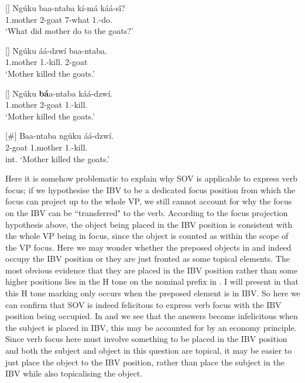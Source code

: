 \documentclass[output=paper,colorlinks,citecolor=brown,
]{langscibook}
\begin{document}
\begin{exe}
    \ex \label{50}
    \begin{xlist}
\ex
[]{
\label{50a}
\gll
Ng\'{u}ku baa-ntaba kí-má káá-sî?\\
1.mother 2-goat 7-what 1\Sm{}.\Pst{}-do.\Pst{}\\
\trans ‘What did mother do to the goats?’
}

\ex
[]{
\label{50b}
\gll
Ng\'{u}ku áá-dzwí baa-ntaba.\\
1.mother 1\Sm{}.\Pst{}-kill.\Pst{} 2-goat\\
\trans ‘Mother killed the goats.’
}

\ex
[]{
\label{50c}
\gll
Ng\'{u}ku \textbf{b\'{a}}a-ntaba káá-dzwí.\\
1.mother 2-goat 1\Sm{}.\Pst{}-kill.\Pst{}\\
\trans ‘Mother killed the goats.’
}

\ex
[\#]{
\label{50d}
\gll
Baa-ntaba ng\'{u}ku áá-dzwí.\\
2-goat 1.mother 1\Sm{}.\Pst{}-kill.\Pst{}\\
\trans int. ‘Mother killed the goats.’
}

    \end{xlist}
\end{exe}
Here it is somehow problematic to explain why SOV is applicable to express verb focus; if we hypothesise the IBV to be a dedicated focus position from which the focus can project up to the whole VP, we still cannot account for why the focus on the IBV can be ``transferred" to the verb. According to the focus projection hypothesis above, the object being placed in the IBV position is consistent with the whole VP being in focus, since the object is counted as within the scope of the VP focus. Here we may wonder whether the preposed objects in  and  indeed occupy the IBV position or they are just fronted as some topical elements. The most obvious evidence that they are placed in the IBV position rather than some higher positions lies in the H tone on the nominal prefix in . I will present in  that this H tone marking only occurs when the preposed element is in IBV. So here we can confirm that SOV is indeed felicitous to express verb focus with the IBV position being occupied. In  and  we see that the answers become infelicitous when the subject is placed in IBV, this may be accounted for by an economy principle. Since verb focus here must involve something to be placed in the IBV position and both the subject and object in this question are topical, it may be easier to just place the object to the IBV position, rather than place the subject in the IBV while also topicalising the object.
\end{document}
